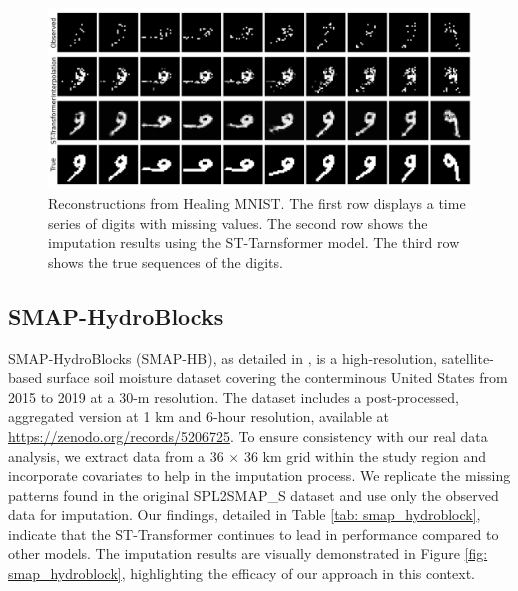 \documentclass[11pt]{article}
\begin{document}
\begin{figure}[H]
\centering
\includegraphics[width=\textwidth]{figure/healing_mnist.png}
\caption{Reconstructions from Healing MNIST. The first row displays a time series of digits with missing values. The second row shows the imputation results using the ST-Tarnsformer model. The third row shows the true sequences of the digits.}
\label{fig: healing_mnist}
\end{figure}


\subsection{SMAP-HydroBlocks}
SMAP-HydroBlocks (SMAP-HB), as detailed in \citet{vergopolan2021smap}, is a high-resolution, satellite-based surface soil moisture dataset covering the conterminous United States from 2015 to 2019 at a 30-m resolution. The dataset includes a post-processed, aggregated version at 1 km and 6-hour resolution, available at \href{https://zenodo.org/records/5206725}{https://zenodo.org/records/5206725}. To ensure consistency with our real data analysis, we extract data from a 36 $\times$ 36 km grid within the study region and incorporate covariates to help in the imputation process. We replicate the missing patterns found in the original SPL2SMAP\_S dataset and use only the observed data for imputation. Our findings, detailed in Table \ref{tab: smap_hydroblock}, indicate that the ST-Transformer continues to lead in performance compared to other models. The imputation results are visually demonstrated in Figure \ref{fig: smap_hydroblock}, highlighting the efficacy of our approach in this context.
\end{document}
